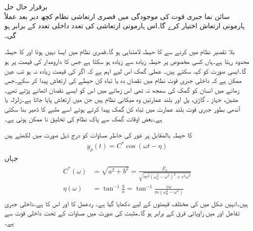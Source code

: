\quad برقرار حال حل\\
سائن نما جبری قوت کی موجودگی میں قصری ارتعاشی نظام کچھ دیر  بعد عملاً ہارمونی ارتعاش اختیار کرے گا۔اس ہارمونی ارتعاشی کی تعدد داخلی تعدد کے برابر ہو گی۔

بلا تقصیر نظام میں   کرنے سے   کا حیطہ لامتناہی ہو گا۔قصری نظام میں ایسا نہیں ہوتا اور  کا حیطہ محدود رہتا ہے۔ہاں کسی مخصوص  پر حیطہ زیادہ سے زیادہ ہو سکتا ہے جس کا دارومدار  کی قیمت پر ہو گا۔ایسی صورت کو  کہہ سکتے ہیں۔ عملی گمک اس لیے اہم ہے کہ اگر  کی قیمت زیادہ نہ ہو تب عین ممکن ہے کہ داخلی  جبری قوت نظام میں نقصان دہ یا  تباہ کن حیطے کی ارتعاش پیدا کر سکے۔جس زمانے میں انسان کو گمک کی سمجھ نہ تھی اس زمانے میں اس کو ایسے نقصان اٹھانے پڑتے تھے۔مشین، جہاز ، گاڑی، پل اور بلند عمارتیں وہ میکانی نظام ہیں جن میں ارتعاش پایا جاتا ہے۔زلزلہ یا آندھی بطور جبری قوت  بلند عمارت میں تباہ کن گمک پیدا کرتے ہوئے اسے ملبے کا ڈھیر بنا سکتی ہے۔بعض اوقات گمک سے پاک نظام کی تخلیق نا ممکن ہوتی ہے۔

 کا حیطہ بالمقابل  پر غور کی خاطر مساوات  کو درج ذیل صورت میں لکھتے ہیں
\begin{align}\label{مساوات_سادہ_دو_برقرار_عملی_گمک_الف}
y_p(t)=C^* \cos(\omega t-\eta)
\end{align}
جہاں
\begin{gather}
\begin{aligned}\label{مساوات_سادہ_دو_حیطہ_زاویہ_الف}
C^*(\omega)&=\sqrt{a^2+b^2}=\frac{F_0}{\sqrt{m^2(\omega_0^2-\omega^2)^2+c^2\omega^2}}\\
\eta(\omega)&=\tan^{-1}\frac{b}{a}=\tan^{-1}\frac{c\omega}{m(\omega_0^2-\omega^2)}
\end{aligned}
\end{gather}
ہیں۔انہیں شکل  میں  کی مختلف قیمتوں کے لیے دکھایا گیا ہے۔ ردعمل  کا  اور  اس کا  ہے۔داخلی جبری تفاعل اور  میں زاویائی فرق  کے برابر ہو گا۔مثبت  کی صورت میں مساوات  کے تحت داخلی قوت سے   ہے۔ 

